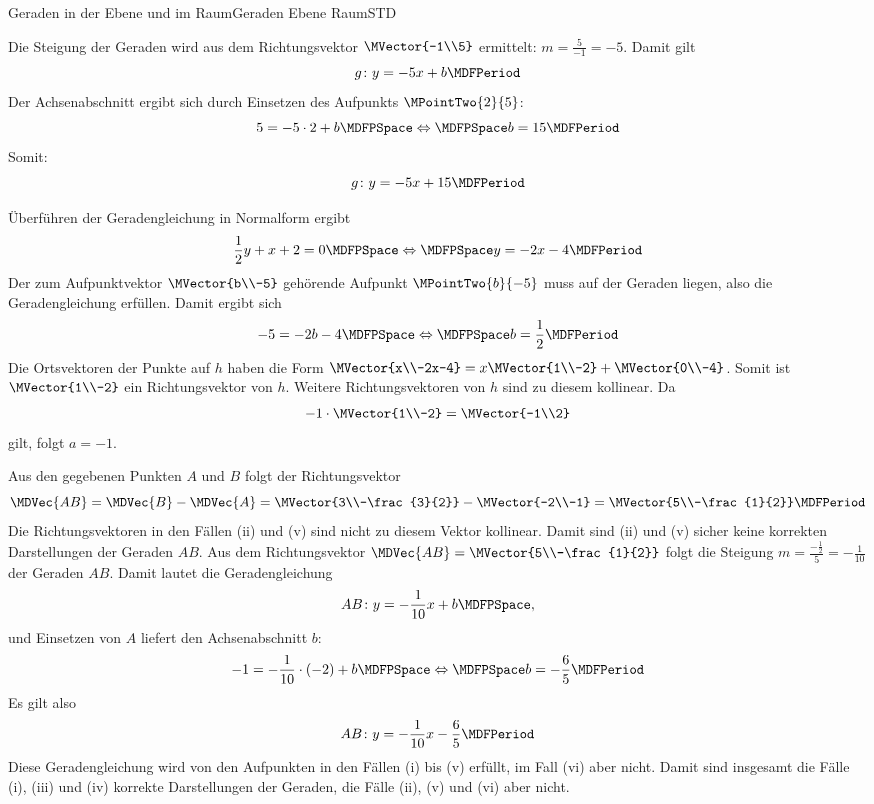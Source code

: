 \begin{MXContent}{Geraden in der Ebene und im Raum}{Geraden Ebene Raum}{STD}
\begin{MExercise}
\begin{MHint}{\iSolution}
 \begin{MExerciseItems}
\item{
Die Steigung der Geraden wird aus dem Richtungsvektor $\MVector{-1\\5}$ ermittelt: $m=\frac{5}{-1}=-5$. Damit gilt
\[
 g\colon y=-5x+b \MDFPeriod
\]
Der Achsenabschnitt ergibt sich durch Einsetzen des Aufpunkts $\MPointTwo{2}{5}$:
\[
 5=-5\cdot 2+b\MDFPSpace\Leftrightarrow\MDFPSpace b=15\MDFPeriod
\]
Somit:
\[
 g\colon y=-5x+15\MDFPeriod
\]
}
\item{
Überführen der Geradengleichung in Normalform ergibt
\[
 \frac{1}{2}y+x+2=0\MDFPSpace\Leftrightarrow\MDFPSpace y=-2x-4 \MDFPeriod
\]
Der zum Aufpunktvektor $\MVector{b\\-5}$ gehörende Aufpunkt $\MPointTwo{b}{-5}$ muss auf der Geraden liegen, also die Geradengleichung erfüllen. Damit ergibt sich
\[
 -5 = -2b-4\MDFPSpace\Leftrightarrow\MDFPSpace b=\frac{1}{2} \MDFPeriod
\]
Die Ortsvektoren der Punkte auf $h$ haben die Form $\MVector{x\\-2x-4}=x\MVector{1\\-2}+\MVector{0\\-4}$. Somit ist $\MVector{1\\-2}$ ein Richtungsvektor von $h$. Weitere Richtungsvektoren von $h$ sind zu diesem kollinear. Da
\[
 -1\cdot\MVector{1\\-2}=\MVector{-1\\2}
\]
gilt, folgt $a=-1$.
}
\item{
Aus den gegebenen Punkten $A$ und $B$ folgt der Richtungsvektor
\[
 \MDVec{A B}=\MDVec{B}-\MDVec{A}=\MVector{3\\-\frac{3}{2}}-\MVector{-2\\-1}=\MVector{5\\-\frac{1}{2}} \MDFPeriod
\]
Die Richtungsvektoren in den Fällen (ii) und (v) sind nicht zu diesem Vektor kollinear. Damit sind (ii) und (v) sicher keine korrekten Darstellungen der Geraden $A B$. Aus dem Richtungsvektor $\MDVec{A B}=\MVector{5\\-\frac{1}{2}}$ folgt die Steigung $m=\frac{-\frac{1}{2}}{5}=-\frac{1}{10}$ der Geraden $A B$. Damit lautet die Geradengleichung
\[
 A B\colon y=-\frac{1}{10}x+b \MDFPSpace ,
\]
und Einsetzen von $A$ liefert den  Achsenabschnitt $b$:
\[
 -1=-\frac{1}{10}\cdot(-2)+b\MDFPSpace\Leftrightarrow\MDFPSpace b=-\frac{6}{5}\MDFPeriod
\]
Es gilt also
\[
 A B\colon y=-\frac{1}{10}x-\frac{6}{5} \MDFPeriod
\]
Diese Geradengleichung wird von den Aufpunkten in den Fällen (i) bis (v) erfüllt, im Fall (vi) aber nicht. Damit sind insgesamt die Fälle (i), (iii) und (iv) korrekte Darstellungen der Geraden, die Fälle (ii), (v) und (vi) aber nicht. 
}
\end{MExerciseItems}
\end{MHint}
\end{MExercise}
\end{MXContent}
